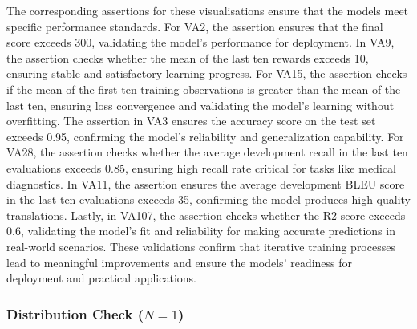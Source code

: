 The corresponding assertions for these visualisations ensure that the models meet specific performance standards. For VA2, the assertion ensures that the final score exceeds 300, validating the model's performance for deployment. In VA9, the assertion checks whether the mean of the last ten rewards exceeds 10, ensuring stable and satisfactory learning progress. For VA15, the assertion checks if the mean of the first ten training observations is greater than the mean of the last ten, ensuring loss convergence and validating the model's learning without overfitting. The assertion in VA3 ensures the accuracy score on the test set exceeds 0.95, confirming the model's reliability and generalization capability. For VA28, the assertion checks whether the average development recall in the last ten evaluations exceeds 0.85, ensuring high recall rate critical for tasks like medical diagnostics. In VA11, the assertion ensures the average development BLEU score in the last ten evaluations exceeds 35, confirming the model produces high-quality translations. Lastly, in VA107, the assertion checks whether the R2 score exceeds 0.6, validating the model's fit and reliability for making accurate predictions in real-world scenarios. These validations confirm that iterative training processes lead to meaningful improvements and ensure the models' readiness for deployment and practical applications.


\subsubsection{Distribution Check ($N = 1$)}

